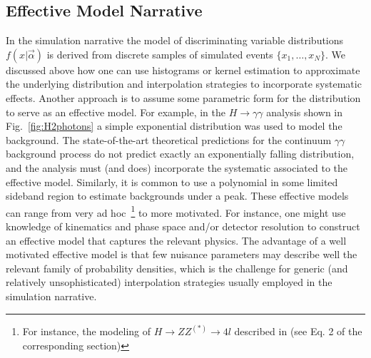 \subsection{Effective Model Narrative}


In the simulation narrative the model of discriminating variable distributions $f(x|\vec\alpha)$ is derived from discrete samples of simulated events $\{x_1,\dots,x_N\}$.   We discussed above how one can use histograms or kernel estimation to approximate the underlying distribution and interpolation strategies to incorporate systematic effects.  Another approach is to assume some parametric form for the distribution to serve as an effective model.  For example, in the $H\to\gamma\gamma$ analysis shown in Fig.~\ref{fig:H2photons} a simple exponential distribution was used to model the background.  The state-of-the-art theoretical predictions for the continuum $\gamma\gamma$ background process do not predict exactly an exponentially falling distribution, and the analysis must (and does) incorporate the systematic associated to the effective model.  Similarly, it is common to use a polynomial in some limited sideband region to estimate backgrounds under a peak.  These effective models can range from very ad hoc~\footnote{For instance, the modeling of $H\to ZZ^{(*)}\to 4l$  described in \cite{Aad:2009wy} (see Eq. 2 of the corresponding section)  } to more motivated.  For instance, one might use knowledge of kinematics and phase space and/or detector resolution to construct an effective model that captures the relevant physics.  The advantage of a well motivated effective model is that few nuisance parameters may describe well the relevant family of probability densities, which is the challenge for generic (and relatively unsophisticated) interpolation strategies usually employed in the simulation narrative.


